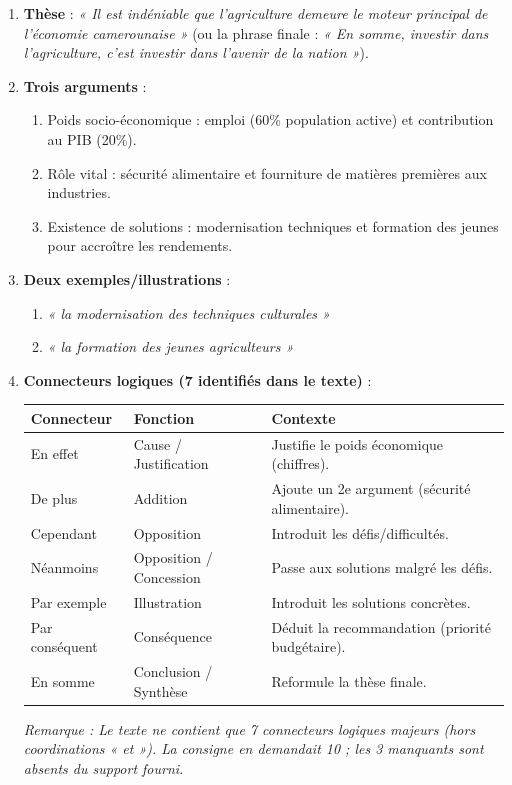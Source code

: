\documentclass[11pt]{article}
\begin{document}
\begin{corrige}
\begin{enumerate}
    \item \textbf{Thèse} : \textit{« Il est indéniable que l'agriculture demeure le moteur principal de l'économie camerounaise »} (ou la phrase finale : \textit{« En somme, investir dans l'agriculture, c'est investir dans l'avenir de la nation »}).
    \item \textbf{Trois arguments} :
    \begin{enumerate}
        \item Poids socio-économique : emploi (60\% population active) et contribution au PIB (20\%).
        \item Rôle vital : sécurité alimentaire et fourniture de matières premières aux industries.
        \item Existence de solutions : modernisation techniques et formation des jeunes pour accroître les rendements.
    \end{enumerate}
    \item \textbf{Deux exemples/illustrations} :
    \begin{enumerate}
        \item \textit{« la modernisation des techniques culturales »}
        \item \textit{« la formation des jeunes agriculteurs »}
    \end{enumerate}
    \item \textbf{Connecteurs logiques (7 identifiés dans le texte)} :
    \begin{center}
    \begin{tabularx}{\linewidth}{|l|l|X|}\hline
    \textbf{Connecteur} & \textbf{Fonction} & \textbf{Contexte} \\ \hline
    En effet & Cause / Justification & Justifie le poids économique (chiffres). \\ \hline
    De plus & Addition & Ajoute un 2e argument (sécurité alimentaire). \\ \hline
    Cependant & Opposition & Introduit les défis/difficultés. \\ \hline
    Néanmoins & Opposition / Concession & Passe aux solutions malgré les défis. \\ \hline
    Par exemple & Illustration & Introduit les solutions concrètes. \\ \hline
    Par conséquent & Conséquence & Déduit la recommandation (priorité budgétaire). \\ \hline
    En somme & Conclusion / Synthèse & Reformule la thèse finale. \\ \hline
    \end{tabularx}
    \end{center}
    \textit{Remarque : Le texte ne contient que 7 connecteurs logiques majeurs (hors coordinations « et »). La consigne en demandait 10 ; les 3 manquants sont absents du support fourni.}
\end{enumerate}
\end{corrige}
\end{document}
